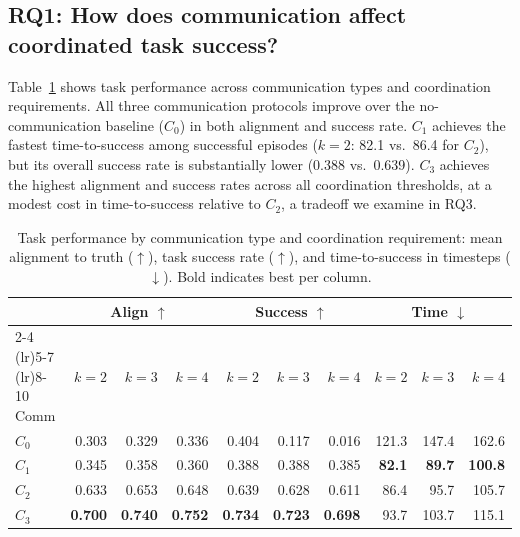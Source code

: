 \documentclass[pdflatex,sn-mathphys-num]{sn-jnl}%
\theoremstyle{thmstyleone}%
\theoremstyle{thmstyletwo}%
\theoremstyle{thmstylethree}%
\begin{document}
\subsection{RQ1: How does communication affect coordinated task success?}

Table~\ref{tab:task_performance}  shows task performance across 
communication types and coordination requirements. All three 
communication protocols improve over the no-communication baseline 
($C_0$) in both alignment and success rate. $C_1$ achieves the 
fastest time-to-success among successful episodes ($k{=}2$: 82.1 
vs.\ 86.4 for $C_2$), but its overall success rate is substantially 
lower (0.388 vs.\ 0.639). $C_3$ achieves the highest alignment and 
success rates across all coordination thresholds, at a modest cost 
in time-to-success relative to $C_2$, a tradeoff we examine in 
RQ3.

\begin{table}[t]
\caption{Task performance by communication type and coordination requirement: mean alignment to truth ($\uparrow$), task success rate ($\uparrow$), and time-to-success in timesteps ($\downarrow$). Bold indicates best per column.}
\label{tab:task_performance}
\begin{tabular}{lrrrrrrrrr}
\toprule
 & \multicolumn{3}{c}{Align $\uparrow$} & \multicolumn{3}{c}{Success $\uparrow$} & \multicolumn{3}{c}{Time $\downarrow$} \\
\cmidrule(lr){2-4} \cmidrule(lr){5-7} \cmidrule(lr){8-10}
Comm & $k{=}2$ & $k{=}3$ & $k{=}4$ & $k{=}2$ & $k{=}3$ & $k{=}4$ & $k{=}2$ & $k{=}3$ & $k{=}4$ \\
\midrule
$C_0$ & 0.303 & 0.329 & 0.336 & 0.404 & 0.117 & 0.016 & 121.3 & 147.4 & 162.6 \\
$C_1$ & 0.345 & 0.358 & 0.360 & 0.388 & 0.388 & 0.385 &  \textbf{82.1} &  \textbf{89.7} & \textbf{100.8} \\
$C_2$ & 0.633 & 0.653 & 0.648 & 0.639 & 0.628 & 0.611 &  86.4 &  95.7 & 105.7 \\
$C_3$ & \textbf{0.700} & \textbf{0.740} & \textbf{0.752} & \textbf{0.734} & \textbf{0.723} & \textbf{0.698} &  93.7 & 103.7 & 115.1 \\
\bottomrule
\end{tabular}
\end{table}
\end{document}
